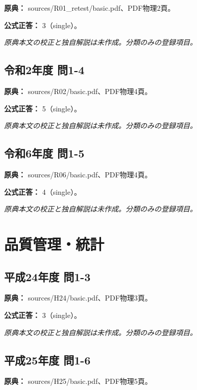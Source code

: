 \noindent\textbf{原典：} sources/R01\_retest/basic.pdf、PDF物理2頁。

\textbf{公式正答：} 3（single）。

\par\textit{原典本文の校正と独自解説は未作成。分類のみの登録項目。}

\subsection{令和2年度 問1-4}
\label{q:r02-reg-basic-1-4}

\noindent\textbf{原典：} sources/R02/basic.pdf、PDF物理4頁。

\textbf{公式正答：} 5（single）。

\par\textit{原典本文の校正と独自解説は未作成。分類のみの登録項目。}

\subsection{令和6年度 問1-5}
\label{q:r06-reg-basic-1-5}

\noindent\textbf{原典：} sources/R06/basic.pdf、PDF物理4頁。

\textbf{公式正答：} 4（single）。

\par\textit{原典本文の校正と独自解説は未作成。分類のみの登録項目。}

\section{品質管理・統計}

\subsection{平成24年度 問1-3}
\label{q:h24-reg-basic-1-3}

\noindent\textbf{原典：} sources/H24/basic.pdf、PDF物理3頁。

\textbf{公式正答：} 3（single）。

\par\textit{原典本文の校正と独自解説は未作成。分類のみの登録項目。}

\subsection{平成25年度 問1-6}
\label{q:h25-reg-basic-1-6}

\noindent\textbf{原典：} sources/H25/basic.pdf、PDF物理5頁。

